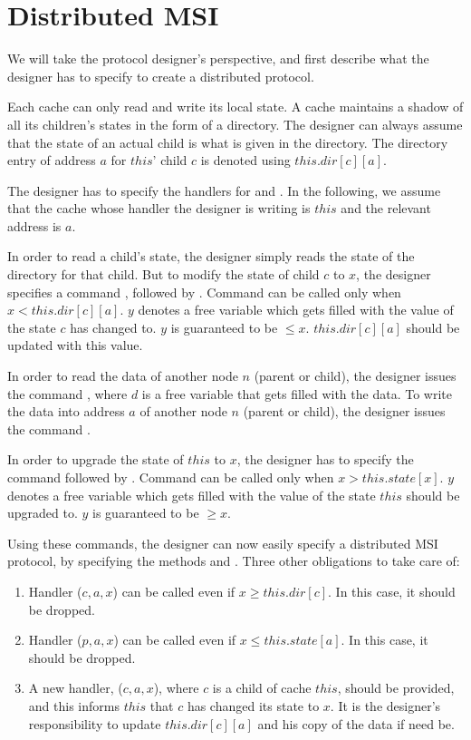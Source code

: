 \section{Distributed MSI}
\label{sec:DistributedMsi}

We will take the protocol designer's perspective, and first describe what the
designer has to specify to create a distributed protocol.

Each cache can only read and write its local state. A cache maintains a shadow
 of all its children's states in the form of a directory. The designer can
always assume that the state of an actual child is what is given in the
directory. The directory entry of address $a$ for $this$' child $c$ is denoted
using $this.dir[c][a]$.

The designer has to specify the handlers for \uReq{} and \dReq{}. In the
following, we assume that the cache whose handler the designer is writing is
$this$ and the relevant address is $a$.

In order to read a child's state, the designer simply reads the state of the
directory for that child. But to modify the state of child $c$ to $x$, the
designer specifies a command \send{} , followed by \receive{}
. Command \send{}  can be called only when $x
< this.dir[c][a]$. $y$ denotes a free variable which gets filled with the value of
the state $c$ has changed to. $y$ is guaranteed to be $\le x$. $this.dir[c][a]$
should be updated with this value.

In order to read the data of another node $n$ (parent or child),
the designer issues the command \receive{} , where $d$ is a free
variable that gets filled with the data. To write the data into address $a$ of
another node $n$ (parent or child), the designer issues the command \send{}
.

In order to upgrade the state of $this$ to $x$, the designer has to
specify the command \send{}  followed by \receive{}
. Command \send{}  can be called only when $x
> this.state[x]$. $y$ denotes a free variable which gets filled with the value of
the state $this$ should be upgraded to. $y$ is guaranteed to be $\ge x$.

Using these commands, the designer can now easily specify a distributed MSI
protocol, by specifying the methods \uReq{} and \dReq{}. Three other
obligations to take care of:
\begin{enumerate}
\item Handler \uReq{}($c, a, x$) can be called even if $x \ge
this.dir[c]$. In this case, it should be dropped.
\item Handler \dReq{}($p, a, x$) can be called even if $x \le
this.state[a]$. In this case, it should be dropped.
\item A new handler, \dRespL{}($c, a, x$), where $c$ is a child of cache $this$,
should be provided, and this informs $this$ that $c$ has changed its state to
$x$. It is the designer's responsibility to update $this.dir[c][a]$ and his
copy of the data if need be.
\end{enumerate}

